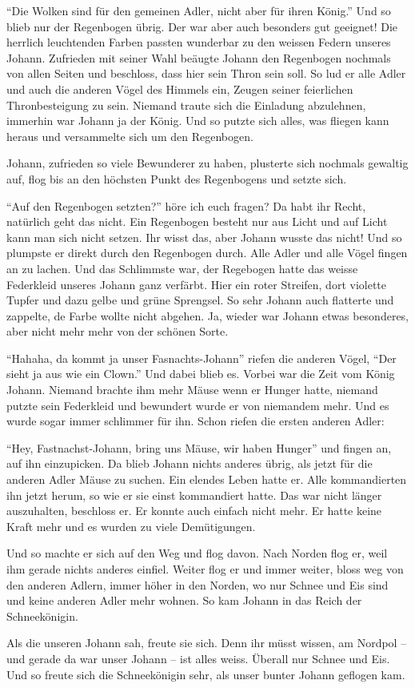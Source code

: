 \enquote{Die Wolken sind für den gemeinen Adler, nicht aber für ihren König.} Und so blieb nur der Regenbogen übrig. Der war aber auch besonders gut geeignet! Die herrlich leuchtenden Farben passten wunderbar zu den weissen Federn unseres Johann. Zufrieden mit seiner Wahl beäugte Johann den Regenbogen nochmals von allen Seiten und beschloss, dass hier sein Thron sein soll. So lud er alle Adler und auch die anderen Vögel des Himmels ein, Zeugen seiner feierlichen Thronbesteigung zu sein. Niemand traute sich die Einladung abzulehnen, immerhin war Johann ja der König. Und so putzte sich alles, was fliegen kann heraus und versammelte sich um den Regenbogen.

Johann, zufrieden so viele Bewunderer zu haben, plusterte sich nochmals gewaltig auf, flog bis an den höchsten Punkt des Regenbogens und setzte sich.

\enquote{Auf den Regenbogen setzten?} höre ich euch fragen? Da habt ihr Recht, natürlich geht das nicht. Ein Regenbogen besteht nur aus Licht und auf Licht kann man sich nicht setzen. Ihr wisst das, aber Johann wusste das nicht! Und so plumpste er direkt durch den Regenbogen durch. Alle Adler und alle Vögel fingen an zu lachen. Und das Schlimmste war, der Regebogen hatte das weisse Federkleid unseres Johann ganz verfärbt. Hier ein roter Streifen, dort violette Tupfer und dazu gelbe und grüne Sprengsel. So sehr Johann auch flatterte und zappelte, de Farbe wollte nicht abgehen. Ja, wieder war Johann etwas besonderes, aber nicht mehr mehr von der schönen Sorte.

\enquote{Hahaha, da kommt ja unser Fasnachts-Johann} riefen die anderen Vögel, \enquote{Der sieht ja aus wie ein Clown.} Und dabei blieb es. Vorbei war die Zeit vom König Johann. Niemand brachte ihm mehr Mäuse wenn er Hunger hatte, niemand putzte sein Federkleid und bewundert wurde er von niemandem mehr. Und es wurde sogar immer schlimmer für ihn. Schon riefen die ersten anderen Adler:

\enquote{Hey, Fastnachst-Johann, bring uns Mäuse, wir haben Hunger} und fingen an, auf ihn einzupicken. Da blieb Johann nichts anderes übrig, als jetzt für die anderen Adler Mäuse zu suchen. Ein elendes Leben hatte er. Alle kommandierten ihn jetzt herum, so wie er sie einst kommandiert hatte. Das war nicht länger auszuhalten, beschloss er. Er konnte auch einfach nicht mehr. Er hatte keine Kraft mehr und es wurden zu viele Demütigungen.

Und so machte er sich auf den Weg und flog davon. Nach Norden flog er, weil ihm gerade nichts anderes einfiel. Weiter flog er und immer weiter, bloss weg von den anderen Adlern, immer höher in den Norden, wo nur Schnee und Eis sind und keine anderen Adler mehr wohnen. So kam Johann in das Reich der Schneekönigin.

Als die unseren Johann sah, freute sie sich. Denn ihr müsst wissen, am Nordpol -- und gerade da war unser Johann -- ist alles weiss. Überall nur Schnee und Eis. Und so freute sich die Schneekönigin sehr, als unser bunter Johann geflogen kam. 
